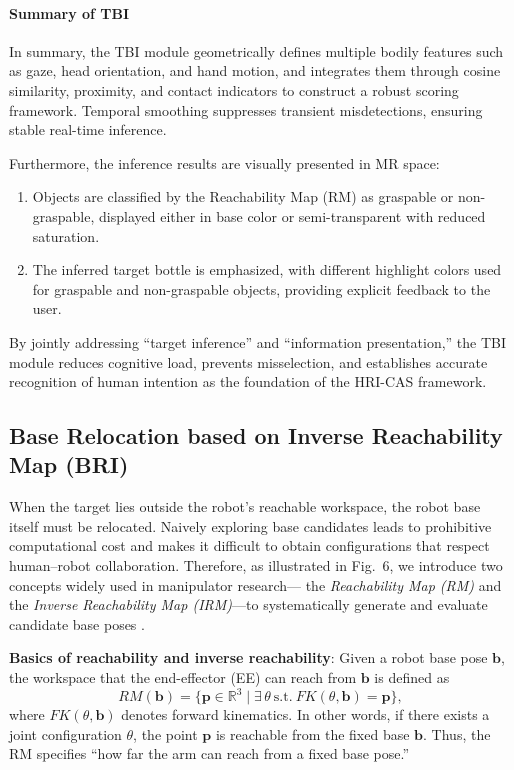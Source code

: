 \documentclass[../../main.tex]{subfiles} %
\begin{document}
\paragraph{Summary of TBI}  
In summary, the TBI module geometrically defines multiple bodily features 
such as gaze, head orientation, and hand motion,  
and integrates them through cosine similarity, proximity, and contact indicators 
to construct a robust scoring framework.  
Temporal smoothing suppresses transient misdetections, ensuring stable real-time inference.  

Furthermore, the inference results are visually presented in MR space:  
\begin{enumerate}
  \item Objects are classified by the Reachability Map (RM) as graspable or non-graspable,  
        displayed either in base color or semi-transparent with reduced saturation.  
  \item The inferred target bottle is emphasized,  
        with different highlight colors used for graspable and non-graspable objects,  
        providing explicit feedback to the user.  
\end{enumerate}

By jointly addressing “target inference” and “information presentation,”  
the TBI module reduces cognitive load, prevents misselection,  
and establishes accurate recognition of human intention as the foundation of the HRI-CAS framework.




\subsection{Base Relocation based on Inverse Reachability Map (BRI)}

When the target lies outside the robot’s reachable workspace, the robot base 
itself must be relocated.  
Naively exploring base candidates leads to prohibitive computational cost and 
makes it difficult 
to obtain configurations that respect human–robot collaboration.  
Therefore, as illustrated in Fig.~6, 
we introduce two concepts widely used in manipulator research— the \textit{Reachability Map (RM)} and
the \textit{Inverse Reachability Map (IRM)}—to systematically generate and evaluate candidate base poses \cite{ref6}. 

\medskip
\textbf{Basics of reachability and inverse reachability}:  
Given a robot base pose $\mathbf{b}$, the workspace that the end-effector (EE) can reach from $\mathbf{b}$ is defined as
\begin{equation}
RM(\mathbf{b}) = \{ \mathbf{p} \in \mathbb{R}^3 \mid \exists\, \theta \ \text{s.t.} \ FK(\theta, \mathbf{b}) = \mathbf{p} \},
\end{equation}
where $FK(\theta,\mathbf{b})$ denotes forward kinematics.  
In other words, if there exists a joint configuration $\theta$, the point $\mathbf{p}$ is reachable from the fixed base $\mathbf{b}$.  
Thus, the RM specifies “how far the arm can reach from a fixed base pose.”
\end{document}
